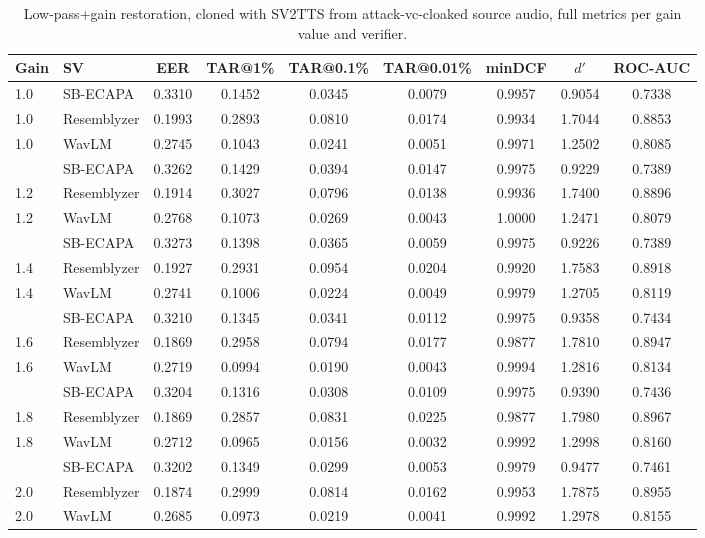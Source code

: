 \documentclass[11pt]{article}
\begin{document}
\begin{table}[H]
\centering
\caption{Low-pass+gain restoration, cloned with SV2TTS from
attack-vc-cloaked source audio, full metrics per gain value and
verifier.}
\label{tab:restoration-lowpass-results}
\begin{tabular}{llccccccc}
\toprule
Gain & SV & EER & TAR@1\% & TAR@0.1\% & TAR@0.01\% & minDCF & $d'$ & ROC-AUC \\
\midrule
1.0 & SB-ECAPA    & 0.3310 & 0.1452 & 0.0345 & 0.0079 & 0.9957 & 0.9054 & 0.7338 \\
1.0 & Resemblyzer & 0.1993 & 0.2893 & 0.0810 & 0.0174 & 0.9934 & 1.7044 & 0.8853 \\
1.0 & WavLM       & 0.2745 & 0.1043 & 0.0241 & 0.0051 & 0.9971 & 1.2502 & 0.8085 \\
\addlinespace
1.2 & SB-ECAPA    & 0.3262 & 0.1429 & 0.0394 & 0.0147 & 0.9975 & 0.9229 & 0.7389 \\
1.2 & Resemblyzer & 0.1914 & 0.3027 & 0.0796 & 0.0138 & 0.9936 & 1.7400 & 0.8896 \\
1.2 & WavLM       & 0.2768 & 0.1073 & 0.0269 & 0.0043 & 1.0000 & 1.2471 & 0.8079 \\
\addlinespace
1.4 & SB-ECAPA    & 0.3273 & 0.1398 & 0.0365 & 0.0059 & 0.9975 & 0.9226 & 0.7389 \\
1.4 & Resemblyzer & 0.1927 & 0.2931 & 0.0954 & 0.0204 & 0.9920 & 1.7583 & 0.8918 \\
1.4 & WavLM       & 0.2741 & 0.1006 & 0.0224 & 0.0049 & 0.9979 & 1.2705 & 0.8119 \\
\addlinespace
1.6 & SB-ECAPA    & 0.3210 & 0.1345 & 0.0341 & 0.0112 & 0.9975 & 0.9358 & 0.7434 \\
1.6 & Resemblyzer & 0.1869 & 0.2958 & 0.0794 & 0.0177 & 0.9877 & 1.7810 & 0.8947 \\
1.6 & WavLM       & 0.2719 & 0.0994 & 0.0190 & 0.0043 & 0.9994 & 1.2816 & 0.8134 \\
\addlinespace
1.8 & SB-ECAPA    & 0.3204 & 0.1316 & 0.0308 & 0.0109 & 0.9975 & 0.9390 & 0.7436 \\
1.8 & Resemblyzer & 0.1869 & 0.2857 & 0.0831 & 0.0225 & 0.9877 & 1.7980 & 0.8967 \\
1.8 & WavLM       & 0.2712 & 0.0965 & 0.0156 & 0.0032 & 0.9992 & 1.2998 & 0.8160 \\
\addlinespace
2.0 & SB-ECAPA    & 0.3202 & 0.1349 & 0.0299 & 0.0053 & 0.9979 & 0.9477 & 0.7461 \\
2.0 & Resemblyzer & 0.1874 & 0.2999 & 0.0814 & 0.0162 & 0.9953 & 1.7875 & 0.8955 \\
2.0 & WavLM       & 0.2685 & 0.0973 & 0.0219 & 0.0041 & 0.9992 & 1.2978 & 0.8155 \\
\bottomrule
\end{tabular}
\end{table}
\end{document}
